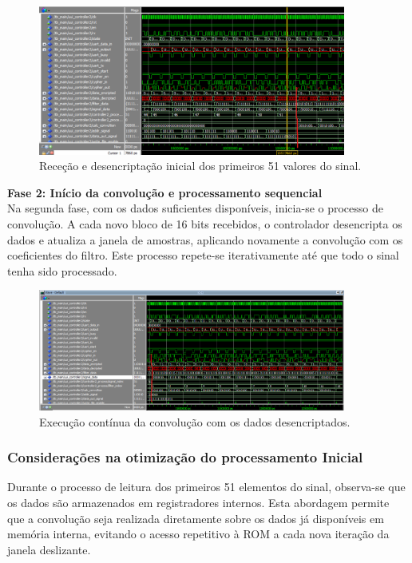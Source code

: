 \documentclass[12pt, a4paper]{article}
\begin{document}
\begin{figure}[H]
    \centering
    \includegraphics[width=0.9\textwidth]{images/controller2_fase1_simulation.png}
    \caption{Receção e desencriptação inicial dos primeiros 51 valores do sinal.}
    \label{fig:controller2_phase1}
\end{figure}


\textbf{Fase 2: Início da convolução e processamento sequencial}\\

Na segunda fase, com os dados suficientes disponíveis, inicia-se o processo de convolução. A cada novo bloco de 16 bits recebidos, o controlador desencripta os dados e atualiza a janela de amostras, aplicando novamente a convolução com os coeficientes do filtro. Este processo repete-se iterativamente até que todo o sinal tenha sido processado.

\begin{figure}[H]
    \centering
    \includegraphics[width=0.9\textwidth]{images/controller2_fase2_simulation.png}
    \caption{Execução contínua da convolução com os dados desencriptados.}
    \label{fig:controller2_phase2}
\end{figure}


\subsubsection{Considerações na otimização do processamento Inicial}

Durante o processo de leitura dos primeiros 51 elementos do sinal, observa-se que os dados são armazenados em registradores internos. Esta abordagem permite que a convolução seja realizada diretamente sobre os dados já disponíveis em memória interna, evitando o acesso repetitivo à ROM a cada nova iteração da janela deslizante.
\end{document}
